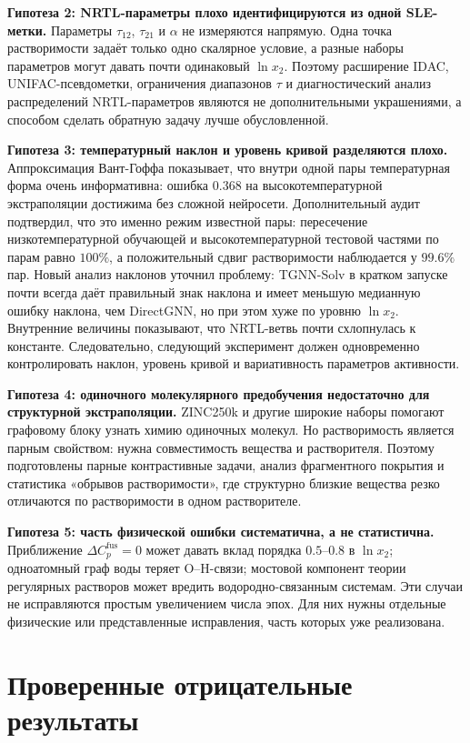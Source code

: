 \documentclass[11pt]{article}
\theoremstyle{definition}
\begin{document}
\textbf{Гипотеза 2: NRTL-параметры плохо идентифицируются из одной SLE-метки.}
Параметры $\tau_{12}$, $\tau_{21}$ и $\alpha$ не измеряются напрямую. Одна точка растворимости задаёт только одно скалярное условие, а разные наборы параметров могут давать почти одинаковый $\ln x_2$. Поэтому расширение IDAC, UNIFAC-псевдометки, ограничения диапазонов $\tau$ и диагностический анализ распределений NRTL-параметров являются не дополнительными украшениями, а способом сделать обратную задачу лучше обусловленной.

\textbf{Гипотеза 3: температурный наклон и уровень кривой разделяются плохо.}
Аппроксимация Вант-Гоффа показывает, что внутри одной пары температурная форма очень информативна: ошибка $0.368$ на высокотемпературной экстраполяции достижима без сложной нейросети. Дополнительный аудит подтвердил, что это именно режим известной пары: пересечение низкотемпературной обучающей и высокотемпературной тестовой частями по парам равно $100\%$, а положительный сдвиг растворимости наблюдается у $99.6\%$ пар. Новый анализ наклонов уточнил проблему: TGNN-Solv в кратком запуске почти всегда даёт правильный знак наклона и имеет меньшую медианную ошибку наклона, чем DirectGNN, но при этом хуже по уровню $\ln x_2$. Внутренние величины показывают, что NRTL-ветвь почти схлопнулась к константе. Следовательно, следующий эксперимент должен одновременно контролировать наклон, уровень кривой и вариативность параметров активности.

\textbf{Гипотеза 4: одиночного молекулярного предобучения недостаточно для структурной экстраполяции.}
ZINC250k и другие широкие наборы помогают графовому блоку узнать химию одиночных молекул. Но растворимость является парным свойством: нужна совместимость вещества и растворителя. Поэтому подготовлены парные контрастивные задачи, анализ фрагментного покрытия и статистика «обрывов растворимости», где структурно близкие вещества резко отличаются по растворимости в одном растворителе.

\textbf{Гипотеза 5: часть физической ошибки систематична, а не статистична.}
Приближение $\Delta C_p^{\mathrm{fus}}=0$ может давать вклад порядка $0.5$--$0.8$ в $\ln x_2$; одноатомный граф воды теряет O--H-связи; мостовой компонент теории регулярных растворов может вредить водородно-связанным системам. Эти случаи не исправляются простым увеличением числа эпох. Для них нужны отдельные физические или представленные исправления, часть которых уже реализована.

\section{Проверенные отрицательные результаты}
\end{document}
